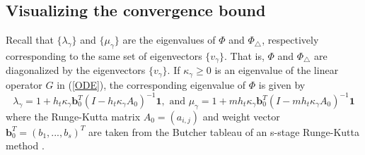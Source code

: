 \documentclass[VANCOUVER,STIX1COL]{WileyNJD-v2}
\begin{document}
\subsection{Visualizing the convergence bound}
\label{sec:verify:vis}

Recall that $\{\lambda_{\gamma}\}$ and $\{\mu_{\gamma}\}$ are the eigenvalues of $\Phi$ and $\Phi_{\triangle}$, respectively corresponding to the same set of eigenvectors $\{v_\gamma\}$. That is, $\Phi$ and $\Phi_{\triangle}$ are diagonalized by the eigenvectors 
$\{v_\gamma\}$.
If $\kappa_{\gamma} \geq 0$ is an eigenvalue of the linear operator $G$ in (\ref{ODE}), the corresponding eigenvalue of $\Phi$ is given by
\begin{equation}
\lambda_\gamma = 1 + h_t \kappa_\gamma \mathbf{b}_0^T (I - h_t \kappa_\gamma A_0)^{-1} \mathbf{1}, \mbox{ and }
\mu_\gamma = 1 + m h_t \kappa_\gamma \mathbf{b}_0^T (I - m h_t \kappa_\gamma A_0)^{-1} \mathbf{1}
\end{equation}
where the Runge-Kutta matrix $A_0 = (a_{i,j})$ and weight vector $\mathbf{b}_0^T = (b_1,...,b_s)^T$ are taken from the Butcher tableau of an s-stage Runge-Kutta method \cite{FrSo2020}.
\end{document}
